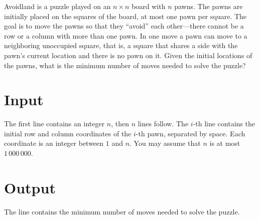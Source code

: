 
Avoidland is a puzzle played on an $n \times n$ board with $n$ pawns. The pawns are initially placed
on the squares of the board, at most one pawn per square. The goal is to move the pawns
so that they ``avoid'' each other---there cannot be a row or a column with more than one
pawn. In one move a pawn can move to a neighboring unoccupied square, that is, a square
that shares a side with the pawn's current location and there is no pawn on it. Given the
initial locations of the pawns, what is the minimum number of moves needed to solve the
puzzle?

\section*{Input}

The first line contains an integer $n$, then $n$ lines follow. The $i$-th line contains
the initial row and column coordinates of the $i$-th pawn, separated by space. Each coordinate
is an integer between $1$ and $n$. You may assume that $n$ is at most $1\,000\,000$.

\section*{Output}

The line contains the minimum number of moves needed to solve the
puzzle.
